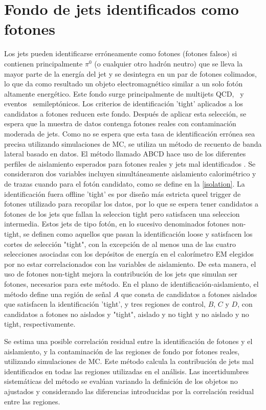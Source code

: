 \section{Fondo de jets identificados como fotones}

Los jets pueden identificarse erróneamente como fotones (fotones falsos) si contienen principalmente $\pi^{0}$ (o cualquier otro hadrón neutro) que se lleva la mayor parte de la
energía del jet y se desintegra en un par de fotones colimados, lo que da como resultado un objeto electromagnético
similar a un solo fotón altamente energético.
Este fondo surge principalmente de multijets QCD, \wj\ y eventos \ttbar\ semileptónicos. Los criterios de identificación 'tight' aplicados a los candidatos a fotones reducen este fondo. Después de aplicar esta selección, se espera que la muestra de datos contenga fotones reales con contaminación moderada de jets. Como no se espera que esta tasa de identificación errónea sea precisa
utilizando simulaciones de MC, se utiliza un método de recuento de banda lateral basado en datos. El método llamado ABCD hace uso de los diferentes perfiles de aislamiento esperados para fotones reales y jets mal identificados \cite{STDM-2010-08}.
Se consideraron dos variables incluyen simultáneamente aislamiento calorimétrico y de trazas cuando para el fotón candidato, como se define en la \ref{isolation}.
La identificación fuera offline 'tight' es por diseño más estricta queel trigger de fotones utilizado para recopilar los datos, por lo que se espera tener candidatos a fotones
de los jets que fallan la seleccion tight pero satisfacen una seleccion intermedia. Estos jets de tipo fotón, en lo sucesivo denominados fotones non-tight, se definen como aquellos que pasan la identificación loose y satisfacen los cortes de selección "tight", con la excepción de al menos una de las cuatro selecciones asociadas con los depósitos de energía en el calorímetro EM elegidos por no estar correlacionados con las variables de aislamiento. De esta manera, el uso de fotones non-tight mejora la contribución de los jets que simulan ser fotones, necesarios para este método.
En el plano de identificación-aislamiento, el método define una región de señal $A$ que consta de candidatos a fotones aislados que satisfacen la identificación 'tight', y tres regiones de control, $B$, $C$ y $D$, con candidatos a fotones no aislados y "tight", aislado y no tight y no aislado y no tight, respectivamente.

Se estima una posible correlación residual entre la identificación de fotones y el aislamiento, y la contaminación de las regiones de fondo por fotones reales, utilizando simulaciones de MC. Este método calcula la contribución de jets mal identificados en todas las regiones utilizadas en el análisis. Las incertidumbres sistemáticas del método se evalúan variando la definición de los objetos no ajustados y considerando las diferencias introducidas por la correlación residual entre las regiones.

